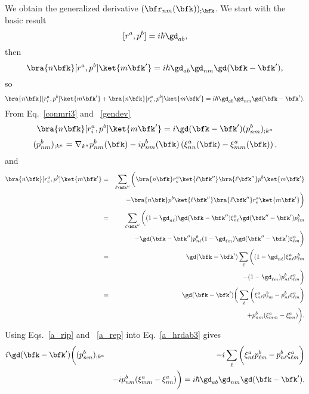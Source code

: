 We obtain the generalized derivative $(\bfr_{nm}(\bfk))_{;\bfk}$.
We start with the basic result
\begin{equation}\label{a_hrdab}
[r^a,p^b]=i\hbar\gd_{ab}
,
\end{equation}
then
\begin{equation}\label{a_hrdab2}
\bra{n\bfk}[r^a,p^b]\ket{m\bfk'}=i\hbar\gd_{ab}\gd_{nm}\gd(\bfk-\bfk')
,
\end{equation}
so
\begin{equation}\label{a_hrdab3}
\bra{n\bfk}[r^a_i,p^b]\ket{m\bfk'}
+
\bra{n\bfk}[r^a_e,p^b]\ket{m\bfk'}
=i\hbar\gd_{ab}\gd_{nm}\gd(\bfk-\bfk')
.
\end{equation}
From Eq.~\eqref{conmri3} and ~\eqref{gendev}
\begin{equation}\label{a_rip}
\bra{n\bfk}[r^a_i,p^b]\ket{m\bfk'}
=i\gd(\bfk-\bfk')(p^b_{nm})_{;k^a}
\end{equation}
\begin{equation}\label{a_ripn}
(p^b_{nm})_{;k^a}=
\nabla_{k^a}
p^b_{n m}(\bfk)
-
i
p^b_{nm}(\bfk)
\left(
\xi^a_{nn}(\bfk)
-
\xi^a_{mm}(\bfk)
\right)
,
\end{equation}
and
\begin{eqnarray}\label{a_rep}
\bra{n\bfk}[r^a_e,p^b]\ket{m\bfk'}&=&
\sum_{\ell\bfk''}
\bigg(
\bra{n\bfk}r^a_e\ket{\ell\bfk''}\bra{\ell\bfk''}p^b\ket{m\bfk'}
\nonumber \\
&&
-
\bra{n\bfk}p^b\ket{\ell\bfk''}\bra{\ell\bfk''}r^a_e\ket{m\bfk'}
\bigg)
\nonumber \\
&=&
\sum_{\ell\bfk''}
\bigg(
(1-\gd_{n\ell})\gd(\bfk-\bfk'')\xi^a_{n\ell}
\gd(\bfk''-\bfk')p^b_{\ell m}
\nonumber \\
&&-
\gd(\bfk-\bfk'')p^b_{n\ell}
(1-\gd_{\ell m})\gd(\bfk''-\bfk')\xi^a_{\ell m}
\bigg)
\nonumber \\
&=&
\gd(\bfk-\bfk')
\sum_{\ell}
\bigg(
(1-\gd_{n\ell})
\xi^a_{n\ell}
p^b_{\ell m}
\nonumber \\
&&-
(1-\gd_{\ell m})
p^b_{n\ell}
\xi^a_{\ell m}
\bigg)
\nonumber \\
&=&
\gd(\bfk-\bfk')
\bigg(
\sum_{\ell}
\bigg(
\xi^a_{n\ell}
p^b_{\ell m}
-
p^b_{n\ell}
\xi^a_{\ell m}
\bigg)
\nonumber \\
&&+
p^b_{nm}(\xi^a_{mm}
-
\xi^a_{nn}
)
\bigg)
.
\end{eqnarray}
Using Eqs.~\eqref{a_rip} and ~\eqref{a_rep}
into Eq.~\eqref{a_hrdab3} gives
\begin{eqnarray}\label{a_rapb}
i\gd(\bfk-\bfk')
\bigg(
(p^b_{nm})_{;k^a}
&&
-i
\sum_{\ell}
\bigg(
\xi^a_{n\ell}
p^b_{\ell m}
-
p^b_{n\ell}
\xi^a_{\ell m}
\bigg)
\nonumber \\
&&
-i
p^b_{nm}(\xi^a_{mm}
-
\xi^a_{nn}
)
\bigg)
=
i\hbar\gd_{ab}\gd_{nm}\gd(\bfk-\bfk')
,
\end{eqnarray}
